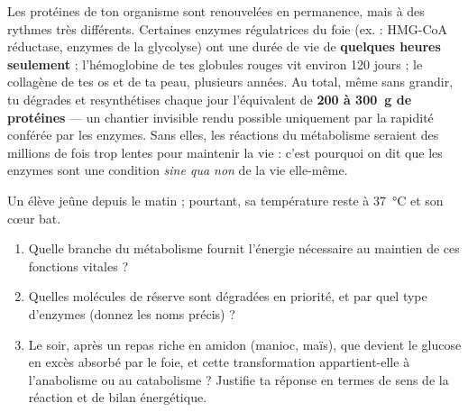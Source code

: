 \documentclass[11pt]{article}
\begin{document}
\begin{savaistu}
Les protéines de ton organisme sont renouvelées en permanence, mais à des rythmes très différents. Certaines enzymes régulatrices du foie (ex. : HMG-CoA réductase, enzymes de la glycolyse) ont une durée de vie de \textbf{quelques heures seulement} ; l'hémoglobine de tes globules rouges vit environ 120 jours ; le collagène de tes os et de ta peau, plusieurs années. Au total, même sans grandir, tu dégrades et resynthétises chaque jour l'équivalent de \textbf{200 à 300~g de protéines} — un chantier invisible rendu possible uniquement par la rapidité conférée par les enzymes. Sans elles, les réactions du métabolisme seraient des millions de fois trop lentes pour maintenir la vie : c'est pourquoi on dit que les enzymes sont une condition \emph{sine qua non} de la vie elle-même.
\end{savaistu}

\begin{exercice}
Un élève jeûne depuis le matin ; pourtant, sa température reste à 37~°C et son c{\oe}ur bat.
\begin{enumerate}
\item Quelle branche du métabolisme fournit l'énergie nécessaire au maintien de ces fonctions vitales ?
\item Quelles molécules de réserve sont dégradées en priorité, et par quel type d'enzymes (donnez les noms précis) ?
\item Le soir, après un repas riche en amidon (manioc, maïs), que devient le glucose en excès absorbé par le foie, et cette transformation appartient-elle à l'anabolisme ou au catabolisme ? Justifie ta réponse en termes de sens de la réaction et de bilan énergétique.
\end{enumerate}
\end{exercice}
\end{document}
